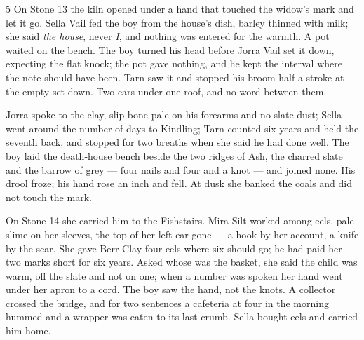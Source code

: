 
\scenebreak


\scenebreak


\scenebreak

\CRtailpiece
\begin{CRchronicle}{5}
On Stone 13 the kiln opened under a hand that touched the widow’s mark and let it go. Sella Vail fed the boy from the house’s dish, barley thinned with milk; she said \emph{the house}, never \emph{I}, and nothing was entered for the warmth. A pot waited on the bench. The boy turned his head before Jorra Vail set it down, expecting the flat knock; the pot gave nothing, and he kept the interval where the note should have been. Tarn saw it and stopped his broom half a stroke at the empty set-down. Two ears under one roof, and no word between them.

Jorra spoke to the clay, slip bone-pale on his forearms and no slate dust; Sella went around the number of days to Kindling; Tarn counted six years and held the seventh back, and stopped for two breaths when she said he had done well. The boy laid the death-house bench beside the two ridges of Ash, the charred slate and the barrow of grey --- four nails and four and a knot --- and joined none. His drool froze; his hand rose an inch and fell. At dusk she banked the coals and did not touch the mark.

On Stone 14 she carried him to the Fishstairs. Mira Silt worked among eels, pale slime on her sleeves, the top of her left ear gone --- a hook by her account, a knife by the scar. She gave Berr Clay four eels where six should go; he had paid her two marks short for six years. Asked whose was the basket, she said the child was warm, off the slate and not on one; when a number was spoken her hand went under her apron to a cord. The boy saw the hand, not the knots. A collector crossed the bridge, and for two sentences a cafeteria at four in the morning hummed and a wrapper was eaten to its last crumb. Sella bought eels and carried him home.


\end{CRchronicle}
